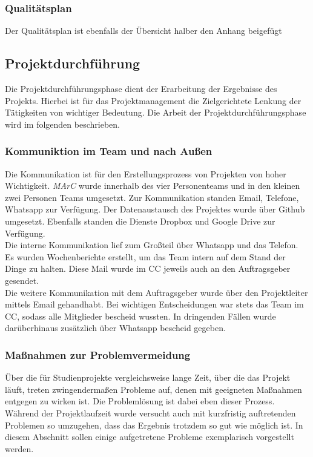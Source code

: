 \subsubsection{Qualitätsplan}
Der Qualitätsplan ist ebenfalls der Übersicht halber den Anhang beigefügt

\subsection{Projektdurchführung}
Die Projektdurchführungsphase dient der Erarbeitung der Ergebnisse des Projekts. Hierbei ist für das Projektmanagement die Zielgerichtete Lenkung der Tätigkeiten von wichtiger Bedeutung. Die Arbeit der Projektdurchführungsphase wird im folgenden beschrieben.
\subsubsection{Kommuniktion im Team und nach Außen}
Die Kommunikation ist für den Erstellungsprozess von Projekten von hoher Wichtigkeit.\textit{ MArC} wurde innerhalb des vier Personenteams und in den kleinen zwei Personen Teams umgesetzt. Zur Kommunikation standen Email, Telefone, Whatsapp zur Verfügung. Der Datenaustausch des Projektes wurde über Github umgesetzt. Ebenfalls standen die Dienste Dropbox und Google Drive zur Verfügung.\\
Die interne Kommunikation lief zum Großteil über Whatsapp und das Telefon. Es wurden Wochenberichte erstellt, um das Team intern auf dem Stand der Dinge zu halten. Diese Mail wurde im CC jeweils auch an den Auftragsgeber gesendet.\\
Die weitere Kommunikation mit dem Auftragsgeber wurde über den Projektleiter mittels Email gehandhabt. Bei wichtigen Entscheidungen war stets das Team im CC, sodass alle Mitglieder bescheid wussten. In dringenden Fällen wurde darüberhinaus zusätzlich über Whatsapp bescheid gegeben.

\subsubsection{Maßnahmen zur Problemvermeidung}
Über die für Studienprojekte vergleichsweise lange Zeit, über die das Projekt läuft, treten zwingendermaßen Probleme auf, denen mit geeigneten Maßnahmen entgegen zu wirken ist. Die Problemlösung ist dabei eben dieser Prozess. Während der Projektlaufzeit wurde versucht auch mit kurzfristig auftretenden Problemen so umzugehen, dass das Ergebnis trotzdem so gut wie möglich ist. In diesem Abschnitt sollen einige aufgetretene Probleme exemplarisch vorgestellt werden.

